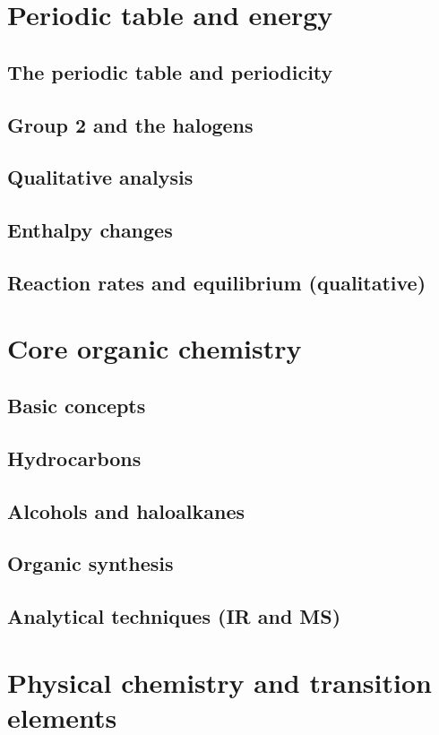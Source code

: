 \part{Periodic table and energy}
\chapter{The periodic table and periodicity}
\chapter{Group 2 and the halogens}
\chapter{Qualitative analysis}
\chapter{Enthalpy changes}
\chapter{Reaction rates and equilibrium (qualitative)}

\part{Core organic chemistry}
\chapter{Basic concepts}
\chapter{Hydrocarbons}
\chapter{Alcohols and haloalkanes}
\chapter{Organic synthesis}
\chapter{Analytical techniques (IR and MS)}

\part{Physical chemistry and transition elements}
